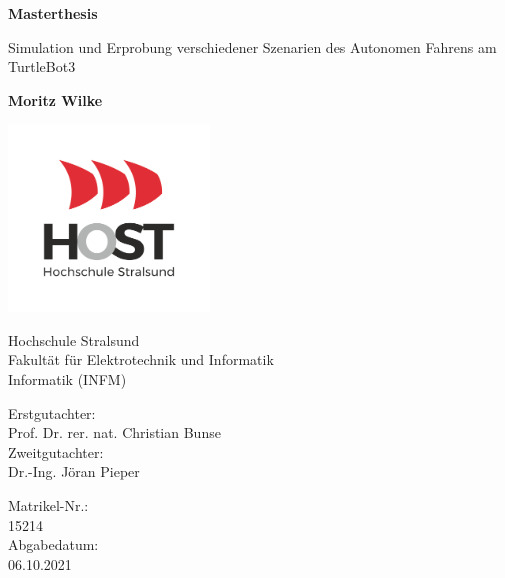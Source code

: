 \documentclass[a4paper,12pt,oneside]{report}
\begin{document}
\begin{titlepage}
    \begin{center}
        \vspace*{1cm}

        \Huge
        \textbf{Masterthesis}

        \vspace{0.5cm}
        \LARGE
        Simulation und Erprobung verschiedener Szenarien des Autonomen Fahrens am TurtleBot3 

        \vspace{0.75cm}

        \textbf{Moritz Wilke}

        \vspace{0.8cm}

        \includegraphics[width=0.4\textwidth]{images/host.png}

        \Large
        Hochschule Stralsund\\
        Fakultät für Elektrotechnik und Informatik\\
        \vspace{0.5cm}
        Informatik (INFM)\\
    \end{center}
    \vfill
    \begin{minipage}{0.45\linewidth}
    \begin{flushleft}
       \small
       Erstgutachter:\\
       Prof. Dr. rer. nat. Christian Bunse\\
       \vspace{0.5cm}
       Zweitgutachter:\\
       Dr.-Ing. Jöran Pieper
    \end{flushleft}
    \end{minipage}
    \hfill
    \begin{minipage}{0.45\linewidth}
    \begin{flushright}
      \small
      Matrikel-Nr.:\\
      15214\\
      \vspace{0.5cm}
      Abgabedatum:\\
      06.10.2021
    \end{flushright}
    \end{minipage}
\end{titlepage}
\end{document}
